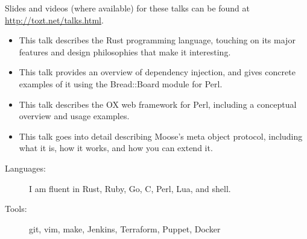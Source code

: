 \documentclass[letterpaper]{article}
\begin{document}

\small{Slides and videos (where available) for these talks can be found at
\url{http://tozt.net/talks.html}.}\normalsize

\begin{itemize}
    \item {} \linebreak \linebreak
        This talk describes the Rust programming language, touching on
        its major features and design philosophies that make it
        interesting.
    \item {} \linebreak \linebreak
        This talk provides an overview of dependency injection, and
        gives concrete examples of it using the Bread::Board module for Perl.
    \item {} \linebreak \linebreak
        This talk describes the OX web framework for Perl, including a
        conceptual overview and usage examples.
    \item {} \linebreak \linebreak
        This talk goes into detail describing Moose's meta object
        protocol, including what it is, how it works, and how you can extend
        it.
\end{itemize}
\begin{description}
    \item[Languages:] I am fluent in Rust, Ruby, Go, C, Perl, Lua, and shell.
    \item[Tools:] git, vim, make, Jenkins, Terraform, Puppet, Docker
\end{description}
\end{document}
